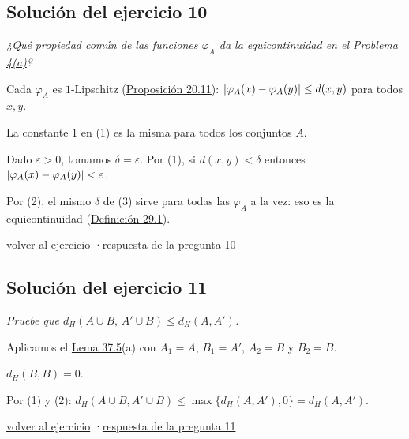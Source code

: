 \documentclass[11pt,a4paper]{article}
\providecommand{\lt}{<}\providecommand{\gt}{>}
\begin{document}
\subsection*{\hypertarget{s-10}{}Solución del ejercicio 10}
\emph{¿Qué propiedad común de las funciones $\varphi_A$ da la equicontinuidad en el Problema \hyperlink{prob-4}{4(a)}?}
\begin{pasos}
\item[(1)] Cada $\varphi_A$ es $1$-Lipschitz (\href{https://decostruttivismo.github.io/MAT2514-repaso/pdf/MAT2514_apuntes_completos.pdf\#nameddest=teorema.20.11}{Proposición 20.11}): $\lvert \varphi_A(x)-\varphi_A(y)\rvert\le d(x,y)$ para todos $x,y$.
\item[(2)] La constante $1$ en (1) es la misma para todos los conjuntos $A$.
\item[(3)] Dado $\varepsilon\gt 0$, tomamos $\delta=\varepsilon$. Por (1), si $d(x,y)\lt \delta$ entonces $\abs{\varphi_A(x)-\varphi_A(y)}\lt \varepsilon$.
\item[] Por (2), el mismo $\delta$ de (3) sirve para todas las $\varphi_A$ a la vez: eso es la equicontinuidad (\href{https://decostruttivismo.github.io/MAT2514-repaso/pdf/MAT2514_apuntes_completos.pdf\#nameddest=teorema.29.1}{Definición 29.1}).
\end{pasos}
\par{\small \hyperlink{x-10}{volver al ejercicio} \quad·\quad \hyperlink{r-10}{respuesta de la pregunta 10}}
\subsection*{\hypertarget{s-11}{}Solución del ejercicio 11}
\emph{Pruebe que $d_H(A\cup B,\,A'\cup B)\le d_H(A,A')$.}
\begin{pasos}
\item[(1)] Aplicamos el \href{https://decostruttivismo.github.io/MAT2514-repaso/pdf/MAT2514_apuntes_completos.pdf\#nameddest=teorema.37.5}{Lema 37.5}(a) con $A_1=A$, $B_1=A'$, $A_2=B$ y $B_2=B$.
\item[(2)] $d_H(B,B)=0$.
\item[] Por (1) y (2): $d_H(A\cup B,A'\cup B)\le\max\{d_H(A,A'),0\}=d_H(A,A')$.
\end{pasos}
\par{\small \hyperlink{x-11}{volver al ejercicio} \quad·\quad \hyperlink{r-11}{respuesta de la pregunta 11}}
\end{document}
